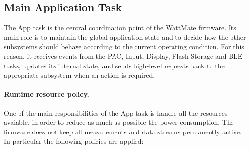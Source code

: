 \subsection{Main Application Task}
\label{Main_Application_Task}

The App task is the central coordination point of the WattMate firmware. Its main role is to maintain the global application state and to decide how the other subsystems should behave according to the current operating condition. For this reason, it receives events from the PAC, Input, Display, Flash Storage and BLE tasks, updates its internal state, and sends high-level requests back to the appropriate subsystem when an action is required.

\paragraph{Runtime resource policy.}
One of the main responsibilities of the App task is handle all the resources avaiable, in order to reduce as much as possible the power consumption. The firmware does not keep all measurements and data streams permanently active. In particular the following policies are applied:
